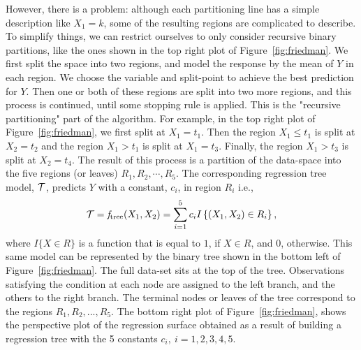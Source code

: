 However, there is a problem: although each partitioning line has a simple description like $X_1 = k$, some of the resulting regions are complicated to describe.
To simplify things, we can restrict ourselves to only consider recursive binary partitions, like the ones shown in the top right plot of Figure~\ref{fig:friedman}.
We first split the space into two regions, and model the response by the mean of $Y$ in each region. 
We choose the variable and split-point to achieve the best prediction for $Y$. 
Then one or both of these regions are split into two more regions, and this process is continued, until some stopping rule is applied. This is the "recursive partitioning" part of the  algorithm. 
For example, in the top right plot of Figure~\ref{fig:friedman}, we first split at $X_1 = t_1$. 
Then the region $X_1 \leq t_1$ is split at $X_2 = t_2$ and the region $X_1 > t_1$ is split at $X_1 = t_3$.
Finally, the region $X_1 > t_3$ is split at $X_2 = t_4$. 
The result of this process is a partition of the data-space into the five regions (or leaves) $R_1, R_2,\cdots, R_5$.
The corresponding regression tree model, $\mathcal{T}$, predicts $Y$ with a constant, $c_i$, in region $R_i$ i.e.,
\begin{equation}
\mathcal{T} = \mathit{f}_{\mathrm{tree}}(X_1,X_2) = \sum_{i=1}^{5} c_i I\left\lbrace(X_1,X_2) \in R_i\right\rbrace,
\label{eq:response}
\end{equation}
where $I\{X\in R\}$ is a function that is equal to $1$, if $X\in R$, and $0$, otherwise.
This same model can be represented by the binary tree shown in the bottom left of Figure~\ref{fig:friedman}. 
The full data-set sits at the top of the tree. 
Observations satisfying the condition at each node are assigned to the left branch, and the others to the right branch. The terminal nodes or leaves of the tree correspond to the regions $R_1,R_2,...,R_5$. 
The bottom right plot of Figure~\ref{fig:friedman}, shows the perspective plot of the regression surface obtained as a result of building a regression tree with the 5 constants $c_i,\ i=1,2,3,4,5$. 
